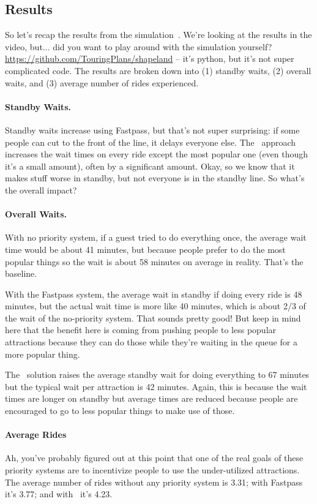 \documentclass[a4paper]{report}
\begin{document}
\subsection*{Results}
So let's recap the results from the simulation~\cite{dldisney}. We're looking at the results in the video, but... did you want to play around with the simulation yourself? \url{https://github.com/TouringPlans/shapeland} -- it's python, but it's not super complicated code. The results are broken down into (1) standby waits, (2) overall waits, and (3) average number of rides experienced. 

\paragraph{Standby Waits.}
Standby waits increase using Fastpass, but that's not super surprising: if some people can cut to the front of the line, it delays everyone else. The \FPP~approach increases the wait times on every ride except the most popular one (even though it's a small amount), often by a significant amount. Okay, so we know that it makes stuff worse in standby, but not everyone is in the standby line. So what's the overall impact?

\paragraph{Overall Waits.}

With no priority system, if a guest tried to do everything once, the average wait time would be about 41 minutes, but because people prefer to do the most popular things so the wait is about 58 minutes on average in reality. That's the baseline.

With the Fastpass system, the average wait in standby if doing every ride is 48 minutes, but the actual wait time is more like 40 minutes, which is about 2/3 of the wait of the no-priority system. That sounds pretty good! But keep in mind here that the benefit here is coming from pushing people to less popular attractions because they can do those while they're waiting in the queue for a more popular thing. 

The \FPP~solution raises the average standby wait for doing everything to 67 minutes but the typical wait per attraction is 42 minutes. Again, this is because the wait times are longer on standby but average times are reduced because people are encouraged to go to less popular things to make use of those.

\paragraph{Average Rides}
Ah, you've probably figured out at this point that one of the real goals of these priority systems are to incentivize people to use the under-utilized attractions. The average number of rides without any priority system is 3.31; with Fastpass it's 3.77; and with \FPP~it's 4.23. 
\end{document}
